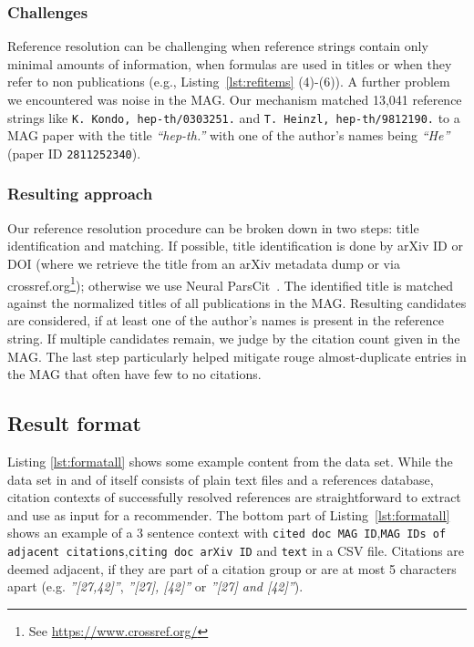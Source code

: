 \subsubsection{Challenges}
Reference resolution can be challenging when reference strings contain only minimal amounts of information, when formulas are used in titles or when they refer to non publications (e.g., Listing~\ref{lst:refitems} (4)-(6)). A further problem we encountered was noise in the MAG. Our mechanism matched 13,041 reference strings like \texttt{K. Kondo, hep-th/0303251.} and \texttt{T. Heinzl, hep-th/9812190.} to a MAG paper with the title \textit{``hep-th.''} with one of the author's names being \textit{``He''} (paper ID \texttt{2811252340}).

\subsubsection{Resulting approach}
Our reference resolution procedure can be broken down in two steps: title identification and matching. If possible, title identification is done by arXiv ID or DOI (where we retrieve the title from an arXiv metadata dump or via crossref.org\footnote{See \url{https://www.crossref.org/}}); otherwise we use Neural ParsCit~\cite{Animesh2018}. The identified title is matched against the normalized titles of all publications in the MAG. Resulting candidates are considered, if at least one of the author's names is present in the reference string. If multiple candidates remain, we judge by the citation count given in the MAG. The last step particularly helped mitigate rouge almost-duplicate entries in the MAG that often have few to no citations.

\subsection{Result format}\label{sec:datasetformat}
Listing \ref{lst:formatall} shows some example content from the data set. While the data set in and of itself consists of plain text files and a references database, citation contexts of successfully resolved references are straightforward to extract and use as input for a recommender. The bottom part of Listing~\ref{lst:formatall} shows an example of a 3 sentence context with \texttt{cited doc MAG ID},\hphantom{n}\texttt{MAG IDs of adjacent citations},\hphantom{n}\texttt{citing doc arXiv ID} and \texttt{text} in a CSV file. Citations are deemed adjacent, if they are part of a citation group or are at most 5 characters apart (e.g. \emph{''[27,42]''}, \emph{''[27], [42]''} or \emph{''[27] and [42]''}). %

